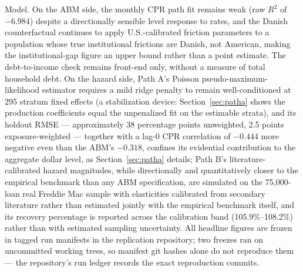 \documentclass[12pt]{article}
\begin{document}
Model. On the ABM side, the monthly CPR path fit remains weak (raw $R^2$ of $-6.984$) despite a directionally sensible level response to rates, and the Danish counterfactual continues to apply U.S.-calibrated friction parameters to a population whose true institutional frictions are Danish, not American, making the institutional-gap figure an upper bound rather than a point estimate. The debt-to-income check remains front-end only, without a measure of total household debt. On the hazard side, Path A's Poisson pseudo-maximum-likelihood estimator requires a mild ridge penalty to remain well-conditioned at 295 stratum fixed effects (a stabilization device: Section~\ref{sec:patha} shows the production coefficients equal the unpenalized fit on the estimable strata), and its holdout RMSE --- approximately 38 percentage points unweighted, 2.5 points exposure-weighted --- together with a lag-0 CPR correlation of $-0.444$ more negative even than the ABM's $-0.318$, confines its evidential contribution to the aggregate dollar level, as Section~\ref{sec:patha} details; Path B's literature-calibrated hazard magnitudes, while directionally and quantitatively closer to the empirical benchmark than any ABM specification, are simulated on the 75,000-loan real Freddie Mac sample with elasticities calibrated from secondary literature rather than estimated jointly with the empirical benchmark itself, and its recovery percentage is reported across the calibration band (105.9\%--108.2\%) rather than with estimated sampling uncertainty. All headline figures are frozen in tagged run manifests in the replication repository; two freezes ran on uncommitted working trees, so manifest git hashes alone do not reproduce them --- the repository's run ledger records the exact reproduction commits.
\end{document}
